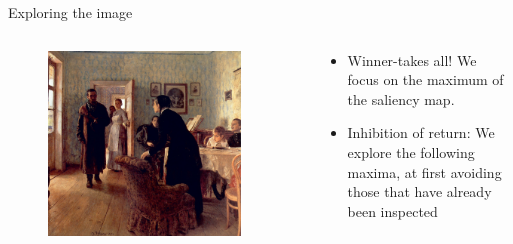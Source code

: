 \documentclass[xcolor=pdftex,dvipsnames,table,mathserif]{beamer}
\begin{document}
\begin{frame}{Exploring the image}


\begin{columns}
  \begin{column}{.5\textwidth}
    \begin{figure}[ht]
      \centering
      \includegraphics[width=0.9\textwidth]{repin_unexpected_visitor}
    \end{figure}
  \end{column}

  \begin{column}{.5\textwidth}

    \begin{itemize}
  \item Winner-takes all! We focus on the maximum of the saliency map.
  \item Inhibition of return: We explore the following maxima, at first avoiding those that have already been inspected
  \end{itemize}

  \end{column}
\end{columns}


\end{frame}
\end{document}
